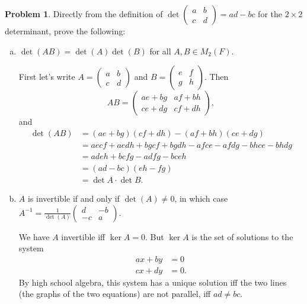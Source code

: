 \documentclass[11pt,oneside]{amsart}
\theoremstyle{definition}
\newtheorem{problem}{Problem}
\begin{document}
    \begin{problem}
        Directly from the definition of $\det\begin{pmatrix}
            a&b\\c&d
        \end{pmatrix}=ad-bc$ for the $2\times 2$ determinant, prove the following:
        \begin{enumerate}[(a)]
            \item $\det(AB)=\det(A)\det(B)$ for all $A,B\in M_2(F)$.
            \begin{solution}
                First let's write $A=\begin{pmatrix}
                    a&b\\c&d
                \end{pmatrix}$ and $B=\begin{pmatrix}
                    e&f\\g&h
                \end{pmatrix}$. Then \[AB=\begin{pmatrix}
                    ae+bg & af+bh \\ ce+dg & cf+dh
                \end{pmatrix},\]
                and
                \[\begin{split}
                    \det(AB) &=(ae+bg)(cf+dh)-(af+bh)(ce+dg)\\
                    &= aecf+aedh+bgcf+bgdh-afce-afdg-bhce-bhdg\\
                    &= adeh+bcfg-adfg-bceh\\
                    &= (ad-bc)(eh-fg)\\
                    &= \det A\cdot\det B.
                \end{split}\]
            \end{solution}
            \item $A$ is invertible if and only if $\det(A)\neq 0$, in which case $A^{-1}=\frac 1{\det(A)}\begin{pmatrix}
                d&-b\\-c&a
            \end{pmatrix}$.
            \begin{solution}
                We have $A$ invertible iff $\ker A=0$. But $\ker A$ is the set of solutions to the system
                \begin{align*}
                    ax+by &= 0\\
                    cx+dy &= 0.
                \end{align*}
                By high school algebra, this system has a unique solution iff the two lines (the graphs of the two equations) are not parallel, iff $ad\neq bc$.


\end{solution}
\end{enumerate}
\end{problem}
\end{document}
